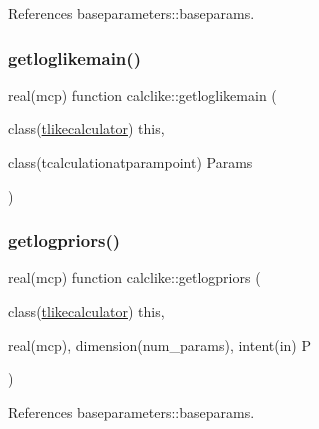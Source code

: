 References baseparameters\+::baseparams.

\mbox{\label{namespacecalclike_a7f2306f2a9d2d0135d6f4852f6ed3bc2}} 
\subsubsection{\texorpdfstring{getloglikemain()}{getloglikemain()}}
{\footnotesize\ttfamily real(mcp) function calclike\+::getloglikemain (\begin{DoxyParamCaption}\item[{class(\mbox{\hyperlink{structcalclike_1_1tlikecalculator}{tlikecalculator}})}]{this,  }\item[{class(tcalculationatparampoint)}]{Params }\end{DoxyParamCaption})\hspace{0.3cm}{\ttfamily [private]}}

\mbox{\label{namespacecalclike_ae8f9437d9cf6441647020ac8e419e424}} 
\subsubsection{\texorpdfstring{getlogpriors()}{getlogpriors()}}
{\footnotesize\ttfamily real(mcp) function calclike\+::getlogpriors (\begin{DoxyParamCaption}\item[{class(\mbox{\hyperlink{structcalclike_1_1tlikecalculator}{tlikecalculator}})}]{this,  }\item[{real(mcp), dimension(num\+\_\+params), intent(in)}]{P }\end{DoxyParamCaption})\hspace{0.3cm}{\ttfamily [private]}}



References baseparameters\+::baseparams.

\mbox{\label{namespacecalclike_ae7eb4423ffdbadbf2df406b9d3331346}} 
